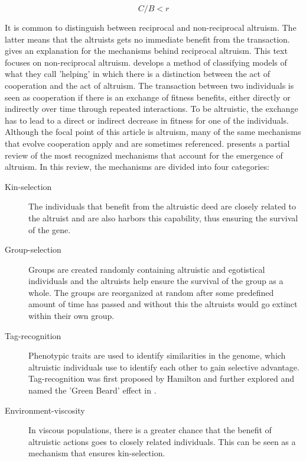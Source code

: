 \documentclass[a4paper]{book}
\begin{document}
\begin{equation}
\label{eq:hamilton}
C/B < r
\end{equation}

It is common to distinguish between reciprocal and non-reciprocal altruism. The latter means that the altruists gets no immediate benefit from the transaction.\cite{trivers_evolution_1971} gives an explanation for the mechanisms behind reciprocal altruism. This text focuses on non-reciprocal altruism.
\cite{lehmann_evolution_2006} develops a method of classifying models of what they call 'helping' in which there is a distinction between the act of cooperation and the act of altruism. 
The transaction between two individuals is seen as cooperation if there is an exchange of fitness benefits, either directly or indirectly over time through repeated interactions. 
To be altruistic, the exchange has to lead to a direct or indirect decrease in fitness for one of the individuals. 
Although the focal point of this article is altruism, many of the same mechanisms that evolve cooperation apply and are sometimes referenced. 
\cite{montanier_environment-driven_2013} presents a partial review of the most recognized mechanisms that account for the emergence of altruism. In this review, the mechanisms are divided into four categories:
\begin{description}
\item[Kin-selection] {The individuals that benefit from the altruistic deed are closely related to the altruist and are also harbors this capability, thus ensuring the survival of the gene.}
\item[Group-selection] {Groups are created randomly containing altruistic and egotistical individuals and the altruists help ensure the survival of the group as a whole. The groups are reorganized at random after some predefined amount of time has passed and without this the altruists would go extinct within their own group.}
\item[Tag-recognition]{Phenotypic traits are used to identify similarities in the genome, which altruistic individuals use to identify each other to gain selective advantage.
Tag-recognition was first proposed by Hamilton and further explored and named the 'Green Beard' effect in \cite{dawkins_selfish_2006}. 
}
\item[Environment-viscosity] {In viscous populations, there is a greater chance that the benefit of altruistic actions goes to closely related individuals. This can be seen as a mechanism that ensures kin-selection.}
\end{description}
\end{document}
